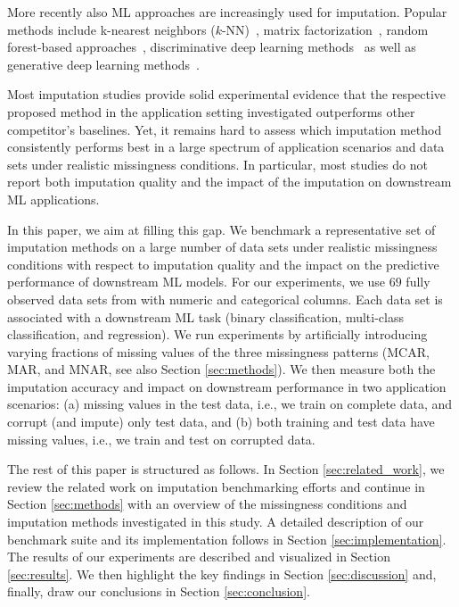 More recently also ML approaches are increasingly used for imputation. Popular methods include k-nearest neighbors ($k$-NN)~\citep{Batista2003}, matrix factorization~\citep{Troyanskaya2001,Koren2009,Mazumder2010}, random forest-based approaches~\citep{Stekhoven2012}, discriminative deep learning methods~\citep{Biessmann2018a} as well as generative deep learning methods~\citep{HIVAE,GAIN}.

Most imputation studies provide solid experimental evidence that the respective proposed method in the application setting investigated outperforms other competitor's baselines. Yet, it remains hard to assess which imputation method consistently performs best in a large spectrum of application scenarios and data sets under realistic missingness conditions. In particular, most studies do not report both imputation quality and the impact of the imputation on downstream ML applications.

In this paper, we aim at filling this gap. We benchmark a representative set of imputation methods on a large number of data sets under realistic missingness conditions with respect to imputation quality and the impact on the predictive performance of downstream ML models. For our experiments, we use $69$ fully observed data sets from  \citep{OpenML2013} with numeric and categorical columns. Each data set is associated with a downstream ML task (binary classification, multi-class classification, and regression). We run experiments by artificially introducing varying fractions of missing values of the three missingness patterns (MCAR, MAR, and MNAR, see also Section \ref{sec:methods}). We then measure both the imputation accuracy and impact on downstream performance in two application scenarios: (a) missing values in the test data, i.e., we train on complete data, and corrupt (and impute) only test data, and (b) both training and test data have missing values, i.e., we train and test on corrupted data.


The rest of this paper is structured as follows. In Section \ref{sec:related_work}, we review the related work on imputation benchmarking efforts and continue in Section \ref{sec:methods} with an overview of the missingness conditions and imputation methods investigated in this study. A detailed description of our benchmark suite and its implementation follows in Section \ref{sec:implementation}. The results of our experiments are described and visualized in Section \ref{sec:results}. We then highlight the key findings in Section \ref{sec:discussion} and, finally, draw our conclusions in Section \ref{sec:conclusion}.
